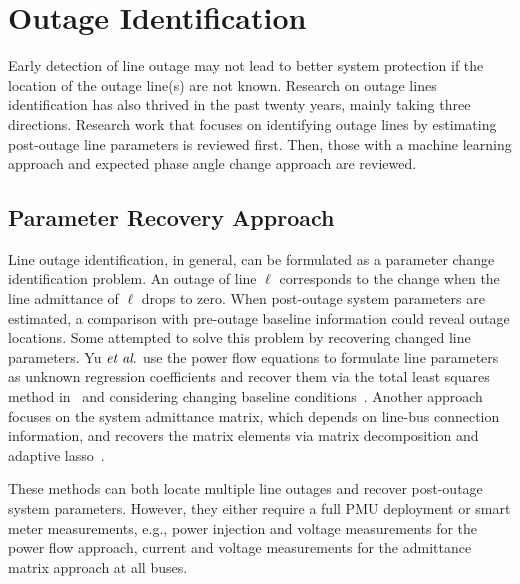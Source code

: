 
\section{Outage Identification} %
\label{sub:outage_identification}
Early detection of line outage may not lead to better system protection if the location of the outage line(s) are not known. Research on outage lines identification has also thrived in the past twenty years, mainly taking three directions. Research work that focuses on identifying outage lines by estimating post-outage line parameters is reviewed first. Then, those with a machine learning approach and expected phase angle change approach are reviewed.

\subsection{Parameter Recovery Approach}
Line outage identification, in general, can be formulated as a parameter change identification problem. An outage of line $\ell$ corresponds to the change when the line admittance of $\ell$ drops to zero. When post-outage system parameters are estimated, a comparison with pre-outage baseline information could reveal outage locations. Some attempted to solve this problem by recovering changed line parameters. Yu $\textit{et al}.$ use the power flow equations to formulate line parameters as unknown regression coefficients and recover them via the total least squares method in~\cite{Yu2018} and considering changing baseline conditions~\cite{Yu2019}. Another approach focuses on the system admittance matrix, which depends on line-bus connection information, and recovers the matrix elements via matrix decomposition and adaptive lasso~\cite{Babakmehr2016,Ardakanian2019a}. 

These methods can both locate multiple line outages and recover post-outage system parameters. However, they either require a full PMU deployment or smart meter measurements, e.g., power injection and voltage measurements for the power flow approach, current and voltage measurements for the admittance matrix approach at all buses.

